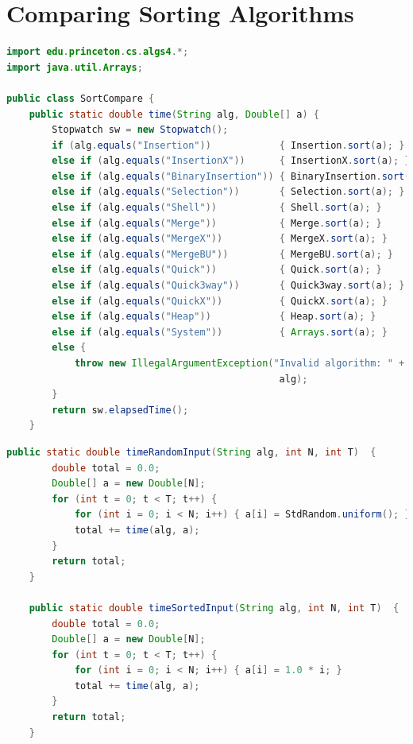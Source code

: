 \documentclass[8pt,a4paper,compress]{beamer}
\begin{document}
\section{Comparing Sorting Algorithms}
\begin{frame}[fragile]
\pause

\begin{lstlisting}[language=Java,style=focusin]
import edu.princeton.cs.algs4.*;
import java.util.Arrays;

public class SortCompare { 
    public static double time(String alg, Double[] a) { 
        Stopwatch sw = new Stopwatch(); 
        if (alg.equals("Insertion"))            { Insertion.sort(a); }
        else if (alg.equals("InsertionX"))      { InsertionX.sort(a); }
        else if (alg.equals("BinaryInsertion")) { BinaryInsertion.sort(a); }
        else if (alg.equals("Selection"))       { Selection.sort(a); }
        else if (alg.equals("Shell"))           { Shell.sort(a); }
        else if (alg.equals("Merge"))           { Merge.sort(a); }
        else if (alg.equals("MergeX"))          { MergeX.sort(a); }
        else if (alg.equals("MergeBU"))         { MergeBU.sort(a); } 
        else if (alg.equals("Quick"))           { Quick.sort(a); }
        else if (alg.equals("Quick3way"))       { Quick3way.sort(a); }
        else if (alg.equals("QuickX"))          { QuickX.sort(a); }
        else if (alg.equals("Heap"))            { Heap.sort(a); }
        else if (alg.equals("System"))          { Arrays.sort(a); }
        else {
            throw new IllegalArgumentException("Invalid algorithm: " + 
                                                alg);
        }
        return sw.elapsedTime(); 
    } 

\end{lstlisting}
\end{frame}

\begin{frame}[fragile]
\pause

\begin{lstlisting}[language=Java,style=focusin]
    public static double timeRandomInput(String alg, int N, int T)  {
        double total = 0.0; 
        Double[] a = new Double[N]; 
        for (int t = 0; t < T; t++) {
            for (int i = 0; i < N; i++) { a[i] = StdRandom.uniform(); }
            total += time(alg, a); 
        } 
        return total; 
    }

    public static double timeSortedInput(String alg, int N, int T)  {
        double total = 0.0; 
        Double[] a = new Double[N]; 
        for (int t = 0; t < T; t++) {
            for (int i = 0; i < N; i++) { a[i] = 1.0 * i; }
            total += time(alg, a); 
        } 
        return total; 
    } 

\end{lstlisting}
\end{frame}
\end{document}
